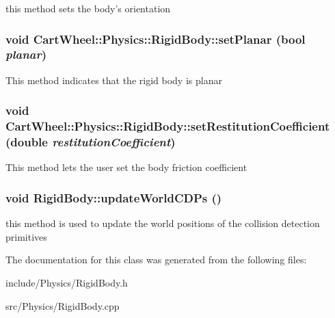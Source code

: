 \label{classCartWheel_1_1Physics_1_1RigidBody_a1d1a3a4e94866d7fde89ab81b117125b}
this method sets the body's orientation \hypertarget{classCartWheel_1_1Physics_1_1RigidBody_a88ef149632bdebc1d5e7f484a41cf4c6}{
\subsubsection[{setPlanar}]{\setlength{\rightskip}{0pt plus 5cm}void CartWheel::Physics::RigidBody::setPlanar (bool {\em planar})}}
\label{classCartWheel_1_1Physics_1_1RigidBody_a88ef149632bdebc1d5e7f484a41cf4c6}
This method indicates that the rigid body is planar \hypertarget{classCartWheel_1_1Physics_1_1RigidBody_a4c009a35d7cf76651c8a890b8c1d4d37}{
\subsubsection[{setRestitutionCoefficient}]{\setlength{\rightskip}{0pt plus 5cm}void CartWheel::Physics::RigidBody::setRestitutionCoefficient (double {\em restitutionCoefficient})}}
\label{classCartWheel_1_1Physics_1_1RigidBody_a4c009a35d7cf76651c8a890b8c1d4d37}
This method lets the user set the body friction coefficient \hypertarget{classCartWheel_1_1Physics_1_1RigidBody_ac302f7d357d4bd862a6eec7f7566c4c5}{
\subsubsection[{updateWorldCDPs}]{\setlength{\rightskip}{0pt plus 5cm}void RigidBody::updateWorldCDPs ()}}
\label{classCartWheel_1_1Physics_1_1RigidBody_ac302f7d357d4bd862a6eec7f7566c4c5}
this method is used to update the world positions of the collision detection primitives 

The documentation for this class was generated from the following files:\begin{DoxyCompactItemize}
\item 
include/Physics/RigidBody.h\item 
src/Physics/RigidBody.cpp\end{DoxyCompactItemize}
